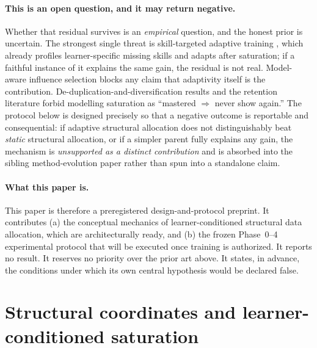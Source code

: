 \documentclass[11pt]{article}
\begin{document}
\paragraph{This is an open question, and it may return negative.}
Whether that residual survives is an \emph{empirical} question, and the honest prior is uncertain. The strongest single threat is skill-targeted adaptive training \cite{he2026stat}, which already profiles learner-specific missing skills and adapts after saturation; if a faithful instance of it explains the same gain, the residual is not real. Model-aware influence selection \cite{yu2024mates} blocks any claim that adaptivity itself is the contribution. De-duplication-and-diversification results \cite{tirumala2023d4} and the retention literature \cite{butler2010} forbid modelling saturation as ``mastered $\Rightarrow$ never show again.'' The protocol below is designed precisely so that a negative outcome is reportable and consequential: if adaptive structural allocation does not distinguishably beat \emph{static} structural allocation, or if a simpler parent fully explains any gain, the mechanism is \emph{unsupported as a distinct contribution} and is absorbed into the sibling method-evolution paper rather than spun into a standalone claim.

\paragraph{What this paper is.}
This paper is therefore a preregistered design-and-protocol preprint. It contributes (a) the conceptual mechanics of learner-conditioned structural data allocation, which are architecturally ready, and (b) the frozen Phase~0--4 experimental protocol that will be executed once training is authorized. It reports no result. It reserves no priority over the prior art above. It states, in advance, the conditions under which its own central hypothesis would be declared false.

\section{Structural coordinates and learner-conditioned saturation}
\label{sec:mechanics}
\end{document}
